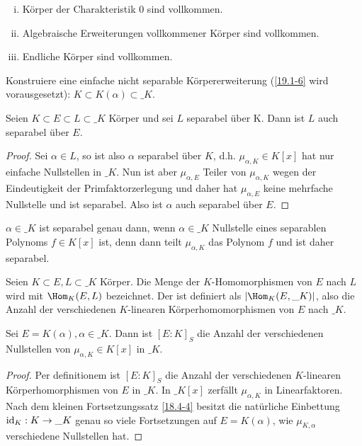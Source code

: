 \setcounter{thm}{5}
\begin{kor} \label{19.1-6}
	\begin{enumerate}[i)]
		\item
			Körper der Charakteristik $0$ sind vollkommen.
		\item
			Algebraische Erweiterungen vollkommener Körper sind vollkommen.
		\item
			Endliche Körper sind vollkommen.
	\end{enumerate}
\end{kor}

\begin{ex} \label{dup:19.1-7}
	Konstruiere eine einfache nicht separable Körpererweiterung (\ref{19.1-6} wird vorausgesetzt): $K \subset K(\alpha) \subset \_K$.
\end{ex}

\begin{lem} \label{19.1-8}
	Seien $K \subset E \subset L \subset \_K$ Körper und sei $L$ separabel über K.
	Dann ist $L$ auch separabel über $E$.
	\begin{proof}
		Sei $\alpha \in L$, so ist also $\alpha$ separabel über $K$, d.h. $\mu_{\alpha, K} \in K[x]$ hat nur einfache Nullstellen in $\_K$.
		Nun ist aber $\mu_{\alpha, E}$ Teiler von $\mu_{\alpha, K}$ wegen der Eindeutigkeit der Primfaktorzerlegung und daher hat $\mu_{\alpha, E}$ keine mehrfache Nullstelle und ist separabel.
		Also ist $\alpha$ auch separabel über $E$.
	\end{proof}
\end{lem}

\begin{nt} \label{19.1-9}
	$\alpha \in \_K$ ist separabel genau dann, wenn $\alpha \in \_K$ Nullstelle eines separablen Polynoms $f \in K[x]$ ist, denn dann teilt $\mu_{\alpha, K}$ das Polynom $f$ und ist daher separabel.
\end{nt}

\begin{df} \label{19.1-10}
	Seien $K \subset E, L \subset \_K$ Körper.
	Die Menge der $K$-Homomorphismen von $E$ nach $L$ wird mit $\Hom_{K}(E, L)$ bezeichnet.
	Der  ist definiert als $|\Hom_{K}(E, \_K)|$, also die Anzahl der verschiedenen $K$-linearen Körperhomomorphismen von $E$ nach $\_K$.
\end{df}

\begin{lem} \label{19.1-11}
	Sei $E = K(\alpha), \alpha \in \_K$.
	Dann ist $[E : K]_S$ die Anzahl der verschiedenen Nullstellen von $\mu_{\alpha, K} \in K[x]$ in $\_K$.
	\begin{proof}
		Per definitionem ist $[E : K]_S$ die Anzahl der verschiedenen $K$-linearen Körperhomorphismen von $E$ in $\_K$.
		In $\_K[x]$ zerfällt $\mu_{\alpha, K}$ in Linearfaktoren.
		Nach dem kleinen Fortsetzungssatz \ref{18.4-4} besitzt die natürliche Einbettung $\operatorname{id}_K: K \to \_K$ genau so viele Fortsetzungen auf $E = K(\alpha)$, wie $\mu_{K, \alpha}$ verschiedene Nullstellen hat.
	\end{proof}
\end{lem}

